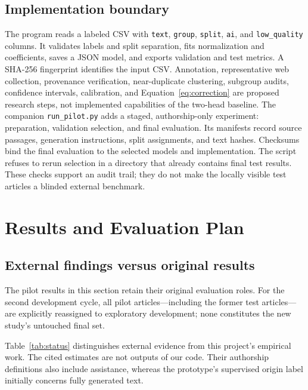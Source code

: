 \documentclass[11pt]{article}
\begin{document}
\subsection{Implementation boundary}
The program reads a labeled CSV with \texttt{text}, \texttt{group},
\texttt{split}, \texttt{ai}, and \texttt{low\_quality} columns. It validates
labels and split separation, fits normalization and coefficients, saves a JSON
model, and exports validation and test metrics. A SHA-256 fingerprint
identifies the input CSV. Annotation, representative web collection,
provenance verification, near-duplicate clustering, subgroup audits, confidence
intervals, calibration, and Equation~\ref{eq:correction} are proposed research
steps, not implemented capabilities of the two-head baseline. The companion
\texttt{run\_pilot.py} adds a staged, authorship-only experiment: preparation,
validation selection, and final evaluation. Its manifests record source
passages, generation instructions, split assignments, and text hashes.
Checksums bind the final evaluation to the selected models and implementation.
The script refuses to rerun selection in a directory that already contains
final test results. These checks support an audit trail; they do not make
the locally visible test articles a blinded external benchmark.

\section{Results and Evaluation Plan}
\subsection{External findings versus original results}
The pilot results in this section retain their original evaluation roles.
For the second development cycle, all pilot articles---including the former
test articles---are explicitly reassigned to exploratory development; none
constitutes the new study's untouched final set.

Table~\ref{tab:status} distinguishes external evidence from this project's
empirical work. The cited estimates are not outputs of our code. Their
authorship definitions also include assistance, whereas the prototype's
supervised origin label initially concerns fully generated text.
\end{document}
